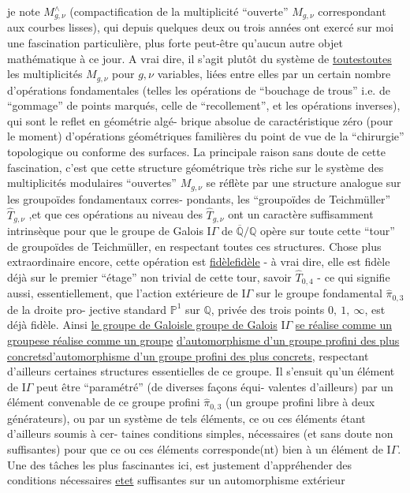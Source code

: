 \documentclass[11pt,a4paper]{article}
\makeatletter
\newif\ifdiplomatic
\newif\ifreading
\def\CurrentApparatus{}
\newcounter{appnote}
\let\TextUline\uline
\renewcommand{\uline}[1]{\ifmmode\underline{#1}\else\TextUline{#1}\fi}
\newcommand{\AppItem}[2]{\par\noindent\textsuperscript{#1}\csname edvariant@#2\endcsname}
\newcommand{\EditionApp}[1]{%
  \stepcounter{appnote}%
  \ifmmode{}^{\scriptscriptstyle\theappnote}\else\textsuperscript{\theappnote}\fi
  \begingroup\edef\x{\endgroup\noexpand\gappto\noexpand\CurrentApparatus{\noexpand\AppItem{\theappnote}{#1}}}\x}
\newcommand{\var}[4]{\ifdiplomatic#1\else#2\ifreading\else\EditionApp{#4}\fi\fi}
\makeatother
\begin{document}
je note $M^{\wedge}_{g,\nu}$ (compactification de la multiplicité ``ouverte''
$M_{g,\nu}$ correspondant aux courbes lisses), qui depuis quelques deux
ou trois années ont exercé sur moi une fascination particulière,
plus forte peut-être qu'aucun autre objet mathématique à ce jour.
A vrai dire, il s'agit plutôt du système de \uline{toutes} les multiplicités
$M_{g,\nu}$ pour $g,\nu$ variables, liées entre elles par un certain nombre
d'opérations fondamentales (telles les opérations de ``bouchage de
trous'' i.e. de ``gommage'' de points marqués, celle de ``recollement'',
et les opérations inverses), qui sont le reflet en géométrie algé-%
brique absolue de caractéristique zéro (pour le moment) d'opérations
géométriques familières du point de vue de la ``chirurgie'' topologique
ou conforme \var{des surface.}{des surfaces.}{slip corrected}{V-FR-006-001} La principale raison sans doute de cette
fascination, c'est que cette structure géométrique très riche sur le
système des multiplicités modulaires ``ouvertes'' $M_{g,\nu}$ se réflète
par une structure analogue sur les groupoïdes fondamentaux corres-%
pondants, les ``groupoïdes de Teichmüller'' $\hat{T}_{g,\nu}$ ,et que ces opérations
au niveau des $\hat{T}_{g,\nu}$ ont un caractère suffisamment intrinsèque pour
que le groupe de Galois $\mathrm{I}\!\Gamma$ de $\overline{\mathbb{Q}}/\mathbb{Q}$ opère sur toute cette ``tour'' de
groupoïdes de Teichmüller, en respectant toutes ces structures. Chose
plus extraordinaire encore, cette opération est \uline{fidèle} - à vrai dire,
elle est fidèle déjà sur le premier ``étage'' non trivial de cette tour,
savoir $\hat{T}_{0,4}$ - ce qui signifie aussi, essentiellement, que l'action
extérieure de $\mathrm{I}\!\Gamma$ sur le groupe fondamental $\hat{\pi}_{0,3}$ de la droite pro-%
jective standard $\mathbb{P}^1$ sur $\mathbb{Q}$, privée des trois points $0,\ 1,\ \infty$, est
déjà fidèle. Ainsi \uline{le groupe de Galois} $\mathrm{I}\!\Gamma$ \uline{se réalise comme un groupe}
\uline{d'automorphisme d'un groupe profini des plus concrets}, respectant
d'ailleurs certaines structures essentielles de ce groupe. Il s'ensuit
qu'un élément de $\mathrm{I}\!\Gamma$ peut être ``paramétré'' (de diverses façons équi-%
valentes d'ailleurs) par un élément convenable de ce groupe profini
$\hat{\pi}_{0,3}$ (un groupe profini libre à deux générateurs), ou par un système
de tels éléments, ce ou ces éléments étant d'ailleurs soumis à cer-%
taines conditions simples, nécessaires (et sans doute non suffisantes)
pour que ce ou ces éléments corresponde(nt) bien à un élément de $\mathrm{I}\!\Gamma$.
Une des tâches les plus fascinantes ici, est justement d'appréhender
des conditions nécessaires \uline{et} suffisantes sur un automorphisme extérieur
\end{document}
